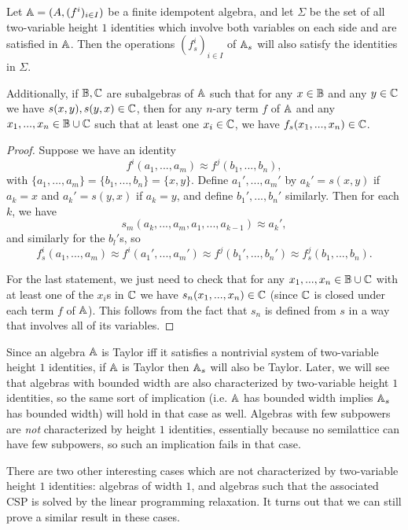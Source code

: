 \documentclass[letterpaper,11pt]{article}
\begin{document}
\begin{prop} Let $\mathbb{A} = (A, (f^i)_{i \in I})$ be a finite idempotent algebra, and let $\Sigma$ be the set of all two-variable height $1$ identities which involve both variables on each side and are satisfied in $\mathbb{A}$. Then the operations $(f^i_s)_{i \in I}$ of $\mathbb{A}_s$ will also satisfy the identities in $\Sigma$.

Additionally, if $\mathbb{B}, \mathbb{C}$ are subalgebras of $\mathbb{A}$ such that for any $x \in \mathbb{B}$ and any $y \in \mathbb{C}$ we have $s(x,y), s(y,x) \in \mathbb{C}$, then for any $n$-ary term $f$ of $\mathbb{A}$ and any $x_1, ..., x_n \in \mathbb{B} \cup \mathbb{C}$ such that at least one $x_i \in \mathbb{C}$, we have $f_s(x_1, ..., x_n) \in \mathbb{C}$.
\end{prop}
\begin{proof} Suppose we have an identity
\[
f^i(a_1, ..., a_m) \approx f^j(b_1, ..., b_n),
\]
with $\{a_1, ..., a_m\} = \{b_1, ..., b_n\} = \{x,y\}$. Define $a_1', ..., a_m'$ by $a_k' = s(x,y)$ if $a_k = x$ and $a_k' = s(y,x)$ if $a_k = y$, and define $b_1', ..., b_n'$ similarly. Then for each $k$, we have
\[
s_m(a_k, ..., a_m, a_1, ..., a_{k-1}) \approx a_k',
\]
and similarly for the $b_l'$s, so
\[
f^i_s(a_1, ..., a_m) \approx f^i(a_1', ..., a_m') \approx f^j(b_1', ..., b_n') \approx f^j_s(b_1, ..., b_n).
\]

For the last statement, we just need to check that for any $x_1, ..., x_n \in \mathbb{B}\cup \mathbb{C}$ with at least one of the $x_i$s in $\mathbb{C}$ we have $s_n(x_1, ..., x_n) \in \mathbb{C}$ (since $\mathbb{C}$ is closed under each term $f$ of $\mathbb{A}$). This follows from the fact that $s_n$ is defined from $s$ in a way that involves all of its variables.
\end{proof}

Since an algebra $\mathbb{A}$ is Taylor iff it satisfies a nontrivial system of two-variable height $1$ identities, if $\mathbb{A}$ is Taylor then $\mathbb{A}_s$ will also be Taylor. Later, we will see that algebras with bounded width are also characterized by two-variable height $1$ identities, so the same sort of implication (i.e. $\mathbb{A}$ has bounded width implies $\mathbb{A}_s$ has bounded width) will hold in that case as well. Algebras with few subpowers are \emph{not} characterized by height $1$ identities, essentially because no semilattice can have few subpowers, so such an implication fails in that case.

There are two other interesting cases which are not characterized by two-variable height $1$ identities: algebras of width $1$, and algebras such that the associated CSP is solved by the linear programming relaxation. It turns out that we can still prove a similar result in these cases.
\end{document}
